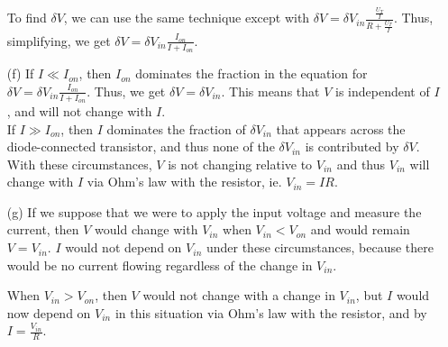 \documentclass{article}
\begin{document}
\begin{itemize}
        To find $\delta V$, we can use the same technique except with $\delta V = \delta V_{in} \frac{ \frac{U_T}{I} }{R + \frac{U_T}{I} }$. Thus, simplifying, we get $\delta V = \delta V_{in} \frac{I_{on}}{I + I_{on}}$.

    \item [(f)]
        If $I \ll I_{on}$, then $I_{on}$ dominates the fraction in the equation for $\delta V = \delta V_{in} \frac{I_{on}}{I + I_{on}}$. Thus, we get $\delta V = \delta V_{in}$. This means that $V$ is independent of $I$, and will not change with $I$. \\

        If $I \gg I_{on}$, then $I$ dominates the fraction of $\delta V_{in}$ that appears across the diode-connected transistor, and thus none of the $\delta V_{in}$ is contributed by $\delta V$. With these circumstances, $V$ is not changing relative to $V_{in}$ and thus $V_{in}$ will change with $I$ via Ohm's law with the resistor, ie. $V_{in} = IR$.

    \item [(g)]
        If we suppose that we were to apply the input voltage and measure the current, then $V$ would change with $V_{in}$ when $V_{in} < V_{on}$ and would remain $V = V_{in}$. $I$ would not depend on $V_{in}$ under these circumstances, because there would be no current flowing regardless of the change in $V_{in}$.

        When $V_{in} > V_{on}$, then $V$ would not change with a change in $V_{in}$, but $I$ would now depend on $V_{in}$ in this situation via Ohm's law with the resistor, and by $I = \frac{V_{in}}{R}$.

\end{itemize}
\end{document}
